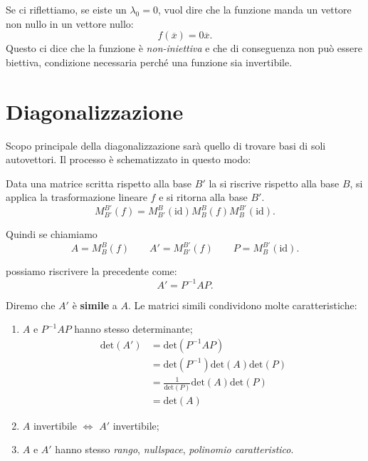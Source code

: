 \documentclass[x11names]{article}
\begin{document}
\noindent
Se ci riflettiamo, se eiste un $\lambda_0 = 0$, vuol dire che la funzione manda un vettore non nullo in  un vettore nullo:
\[
f\left(\overline{x}\right) = 0\overline{x}
.\] 
Questo ci dice che la funzione è \textit{non-iniettiva} e che di conseguenza non può essere biettiva, condizione necessaria perché una funzione sia invertibile.




\section{Diagonalizzazione}
Scopo principale della diagonalizzazione sarà quello di trovare basi di soli autovettori. Il processo è schematizzato in questo modo:
\begin{center}

\end{center}

\noindent
Data una matrice scritta rispetto alla base $B'$ la si riscrive rispetto alla base  $B$, si applica la trasformazione lineare  $f$ e si ritorna alla base  $B'$. 
 \[
 M^{B'}_{B'}\left(f\right) = M^{B}_{B'}\left(\text{id}\right) M^{B}_{B}\left(f\right) M^{B'}_{B}\left(\text{id}\right)
.\] 

\noindent
Quindi se chiamiamo
\[
A = M^{B}_{B}\left(f\right) \qquad A' = M^{B'}_{B'}\left(f\right) \qquad P = M^{B'}_{B}\left(\text{id}\right)
.\] 

\noindent
possiamo riscrivere la precedente come:
\[
A' = P^{-1} A P
.\] 

\noindent
Diremo che $A'$ è  \textbf{simile} a $A$. Le matrici simili condividono molte caratteristiche:
\begin{enumerate}
	\item $A$ e  $P^{-1}AP$ hanno stesso determinante;
\begin{align*}
	\text{det}\left(A'\right) &= \text{det}\left(P^{-1}AP\right)\\ 
		   &= \text{det}\left(P^{-1}\right)\text{det}\left(A\right)\text{det}\left(P\right) \\
		   &= \frac{1}{\text{det}\left(P\right)} \text{det}\left(A\right) \text{det}\left(P\right) \\
		   &=\text{det}\left(A\right)
\end{align*}
\item $A$ invertibile  $\Longleftrightarrow$  $A'$ invertibile;
\item  $A$ e  $A'$ hanno stesso  \textit{rango}, \textit{nullspace}, \textit{polinomio caratteristico}.
\end{enumerate}
\end{document}
